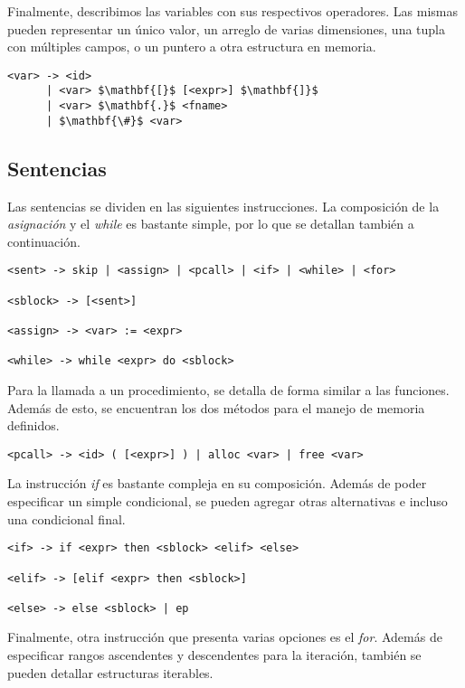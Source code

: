 \documentclass{article}
\begin{document}
Finalmente, describimos las variables con sus respectivos operadores.
Las mismas pueden representar un único valor, un arreglo de varias dimensiones, una tupla con múltiples campos, o un puntero a otra estructura en memoria. 

\begin{lstlisting}[style = syntax]
<var> -> <id>
      | <var> $\mathbf{[}$ [<expr>] $\mathbf{]}$
      | <var> $\mathbf{.}$ <fname>
      | $\mathbf{\#}$ <var>
\end{lstlisting}

\subsection{Sentencias}

Las sentencias se dividen en las siguientes instrucciones.
La composición de la \textit{asignación} y el \textit{while} es bastante simple, por lo que se detallan también a continuación.

\begin{lstlisting}[style = syntax]
<sent> -> skip | <assign> | <pcall> | <if> | <while> | <for>

<sblock> -> [<sent>]

<assign> -> <var> := <expr>

<while> -> while <expr> do <sblock>
\end{lstlisting}

Para la llamada a un procedimiento, se detalla de forma similar a las funciones.
Además de esto, se encuentran los dos métodos para el manejo de memoria definidos.

\begin{lstlisting}[style = syntax]
<pcall> -> <id> ( [<expr>] ) | alloc <var> | free <var>
\end{lstlisting}

La instrucción \textit{if} es bastante compleja en su composición.
Además de poder especificar un simple condicional, se pueden agregar otras alternativas e incluso una condicional final.

\begin{lstlisting}[style = syntax]
<if> -> if <expr> then <sblock> <elif> <else>

<elif> -> [elif <expr> then <sblock>]

<else> -> else <sblock> | ep 
\end{lstlisting}

Finalmente, otra instrucción que presenta varias opciones es el \textit{for}.
Además de especificar rangos ascendentes y descendentes para la iteración, también se pueden detallar estructuras iterables.
\end{document}
